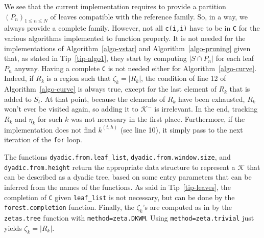 \documentclass[
  11pt,
  a4paper,
]{article}
\theoremstyle{plain}
\theoremstyle{definition}
\theoremstyle{plain}
\theoremstyle{definition}
\theoremstyle{plain}
\theoremstyle{remark}
\newcounter{quartocallouttipno}
\newcommand{\quartocallouttip}[1]{\refstepcounter{quartocallouttipno}\label{#1}}
\begin{document}
\begin{tcolorbox}[enhanced jigsaw, arc=.35mm, bottomrule=.15mm, bottomtitle=1mm, breakable, colback=white, colbacktitle=quarto-callout-tip-color!10!white, colframe=quarto-callout-tip-color-frame, coltitle=black, left=2mm, leftrule=.75mm, opacityback=0, opacitybacktitle=0.6, rightrule=.15mm, title=\textcolor{quarto-callout-tip-color}{\faLightbulb}\hspace{0.5em}{Tip \ref*{tip-leaves}}, titlerule=0mm, toprule=.15mm, toptitle=1mm]

\quartocallouttip{tip-leaves} 

We see that the current implementation requires to provide a partition
\((P_n)_{1\leq n \leq N}\) of leaves compatible with the reference
family. So, in a way, we always provide a complete family. However, not
all \texttt{c(i,i)} have to be in \texttt{C} for the various algorithms
implemented to function properly. It is not needed for the
implementations of Algorithm~\ref{algo-vstar} and
Algorithm~\ref{algo-pruning} given that, as stated in
Tip~\ref{tip-algo1}, they start by computing \(|S\cap P_n|\) for each
leaf \(P_n\) anyway. Having a complete \texttt{C} is not needed either
for Algorithm~\ref{algo-curve}. Indeed, if \(R_k\) is a region such that
\(\zeta_k=|R_k|\), the condition of line 12 of
Algorithm~\ref{algo-curve} is always true, except for the last element
of \(R_k\) that is added to \(S_t\). At that point, because the elements
of \(R_k\) have been exhausted, \(R_k\) won't ever be visited again, so
adding it to \(\mathcal{K}^-\) is irrelevant. In the end, tracking
\(R_k\) and \(\eta_k\) for such \(k\) was not necessary in the first
place. Furthermore, if the implementation does not find \(k^{(t,h)}\)
(see line 10), it simply pass to the next iteration of the \texttt{for}
loop.

\end{tcolorbox}

The functions \texttt{dyadic.from.leaf\_list},
\texttt{dyadic.from.window.size}, and \texttt{dyadic.from.height} return
the appropriate data structure to represent a \(\mathcal{K}\) that can
be described as a dyadic tree, based on some entry parameters that can
be inferred from the names of the functions. As said in
Tip~\ref{tip-leaves}, the completion of \texttt{C} given
\texttt{leaf\_list} is not necessary, but can be done by the
\texttt{forest.completion} function. Finally, the \(\zeta_k\)'s are
computed as in \citet{MR4178188} by the \texttt{zetas.tree} function
with \texttt{method=zeta.DKWM}. Using \texttt{method=zeta.trivial} just
yields \(\zeta_k=|R_k|\).
\end{document}
